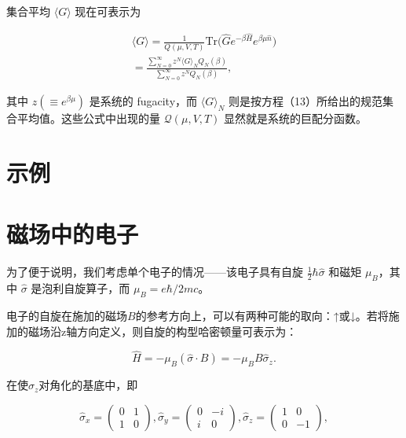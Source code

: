 集合平均 \(\langle G\rangle\) 现在可表示为

\begin{equation}\tag{5.2.16}\label{eq:5.2.16}
\begin{array}{r} { \langle G \rangle = \frac { 1 } { Q ( \mu , V , T ) } \mathrm { T r } \big ( \hat { G } e ^{- \beta \hat { H} } e ^{\beta \mu \hat { n} } \big ) } \\{ = \frac { \displaystyle \sum _ { N = 0 } ^{\infty} z ^{N} \langle G \rangle _ { N } Q _ { N } ( \beta ) } { \displaystyle \sum _ { N = 0 } ^{\infty} z ^{N} Q _ { N } ( \beta ) } , } \end{array}
\end{equation}

其中 \(z(\equiv e^{\beta\mu})\) 是系统的 fugacity，而 \(\langle G\rangle_{N}\) 则是按方程（13）所给出的规范集合平均值。这些公式中出现的量 \(\mathcal{Q}(\mu,V,T)\) 显然就是系统的巨配分函数。

\section{示例}\label{ux793aux4f8b_chap5}

\section{磁场中的电子}\label{a-ux78c1ux573aux4e2dux7684ux7535ux5b50}

为了便于说明，我们考虑单个电子的情况------该电子具有自旋 \(\frac{1}{2}\hbar\hat{\sigma}\) 和磁矩 \(\mu_{B}\)，其中 \(\hat{\sigma}\) 是泡利自旋算子，而 \(\mu_{B}=e\hbar/2mc\)。

电子的自旋在施加的磁场\(B\)的参考方向上，可以有两种可能的取向：↑或↓。若将施加的磁场沿z轴方向定义，则自旋的构型哈密顿量可表示为：

\begin{equation}\tag{5.3.1}\label{eq:5.3.1}
\hat { H } = - \mu _ { B } ( \hat { \sigma } \cdot B ) = - \mu _ { B } B \hat { \sigma } _ { z } .
\end{equation}

在使\(\hat{\sigma}_{z}\)对角化的基底中，即

\begin{equation}\tag{5.3.2}\label{eq:5.3.2}
\hat { \sigma } _ { x } = \left( \begin{array}{ll} { 0 } & { 1 } \\{ 1 } & { 0 } \end{array} \right) ,  \hat { \sigma } _ { y } = \left( \begin{array}{ll} { 0 } & { - i } \\{ i } & { 0 } \end{array} \right) ,  \hat { \sigma } _ { z } = \left( \begin{array}{ll} { 1 } & { 0 } \\{ 0 } & { - 1 } \end{array} \right) ,
\end{equation}

